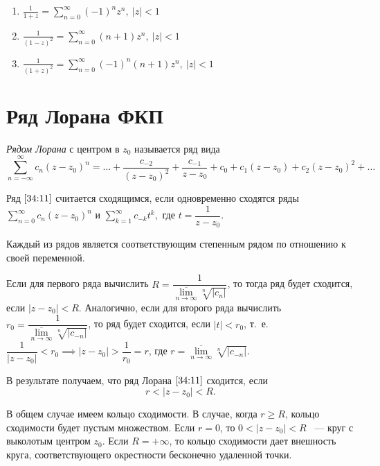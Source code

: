 \documentclass[../../main.tex]{subfiles}
\begin{document}
\begin{rems}
\begin{enumerate}
\begin{enumerate}
			\item $\displaystyle \frac{1}{1 + z} = \sum\limits_{n = 0}^{\infty} 
			(-1)^nz^n,\  |z| < 1$
			
			\item $\displaystyle \frac{1}{(1 - z)^2} = \sum\limits_{n = 0}^{\infty} (n 
			+ 1)z^n,\ |z| < 1$
			
			\item $\displaystyle \frac{1}{(1 + z)^2} = \sum\limits_{n = 0}^{\infty} 
			(-1)^n(n + 1)z^n,\ |z| < 1$
		\end{enumerate}
	\end{enumerate}
\end{rems}

\section{Ряд Лорана ФКП}

\emph{Рядом Лорана} с центром в $ z_0 $ называется ряд вида
\begin{equation}\label{34:11}
	\sum\limits_{n = -\infty}^{\infty}c_n(z - z_0)^n = \ldots + \frac{c_{-2}}{
	(z - z_0)^2} 
	+ \frac{c_{-1}}{z - z_0} + c_0 + c_1(z - z_0) + c_2(z - z_0)^2 + \ldots
\end{equation}

Ряд $ \eqref{34:11} $ считается сходящимся, если одновременно сходятся ряды 
$ \sum\limits_{n = 0}^{\infty} c_n(z - z_0)^n$ и $ 
\sum\limits_{k = 1}^{\infty} c_{-k}t^k,$ где $t = \dfrac{1}{z - z_0}.$

Каждый из рядов является соответствующим степенным рядом по отношению к своей 
переменной.

Если для первого ряда вычислить $ R = \dfrac{1}{\overline{\underset{n \to 
\infty}{\lim}} \sqrt[n]{|c_n|}} $, то тогда ряд будет сходится, если $ |z - 
z_0| < R $.
Аналогично, если для второго ряда вычислить $ r_0 = 
\dfrac{1}{\overline{\underset{n \to \infty}{\lim}} \sqrt[n]{|c_{-n}|}} $, то ряд 
будет сходится, если $ |t| < r_0 $, т.~е. $ \dfrac{1}{|z - z_0|} < r_0 
\implies 
|z - z_0| > \dfrac{1}{r_0} = r $, где $ r = \overline{\underset{n \to 
\infty}{\lim}} \sqrt[n]{|c_{-n}|} $.

В результате получаем, что ряд Лорана $ \eqref{34:11} $ сходится, если
\[ r < |z - z_0| < R. \]

В общем случае имеем кольцо сходимости.
В случае, когда $ r \geq R $, кольцо сходимости будет пустым множеством.
Если $r = 0$, то $ 0 < |z - z_0| < R $ ~--- круг с выколотым центром $z_0$.
Если $ R = +\infty $, то кольцо сходимости дает внешность круга, 
соответствующего окрестности бесконечно удаленной точки.
\end{document}
